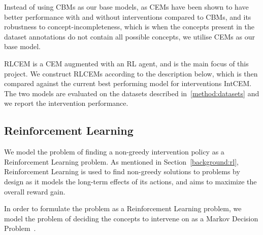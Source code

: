 Instead of using CBMs as our base models, as CEMs have been shown to have
better performance with and without interventions compared to CBMs, and its 
robustness to concept-incompleteness, which is when the concepts present 
in the dataset annotations do not contain all possible concepts, we utilise CEMs
as our base model.

RLCEM is a CEM augmented with an RL agent, and is the main focus of this project.
We construct RLCEMs according to the description below, which is then compared
against the current best performing model for interventions IntCEM. The two models 
are evaluated on the datasets described in~\ref{method:datasets} and we report
the intervention performance.

\subsection{Reinforcement Learning}\label{method:rl}


We model the problem of finding a non-greedy intervention policy as a 
Reinforcement Learning problem. As mentioned in Section~\ref{background:rl},
Reinforcement Learning is used to find non-greedy solutions to problems
by design as it models the long-term effects of its actions, and aims to 
maximize the overall reward gain. 

In order to formulate the problem
as a Reinforcement Learning problem, we model the problem
of deciding the concepts to intervene on  
as a Markov Decision Problem~\cite{rl-mdp}.

